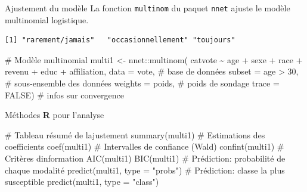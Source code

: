 \documentclass[
  ignorenonframetext,
]{beamer}
\newenvironment{Shaded}{\begin{snugshade}}{\end{snugshade}}
\newcommand{\AttributeTok}[1]{\textcolor[rgb]{0.40,0.45,0.13}{#1}}
\newcommand{\CommentTok}[1]{\textcolor[rgb]{0.37,0.37,0.37}{#1}}
\newcommand{\ConstantTok}[1]{\textcolor[rgb]{0.56,0.35,0.01}{#1}}
\newcommand{\DecValTok}[1]{\textcolor[rgb]{0.68,0.00,0.00}{#1}}
\newcommand{\FunctionTok}[1]{\textcolor[rgb]{0.28,0.35,0.67}{#1}}
\newcommand{\NormalTok}[1]{\textcolor[rgb]{0.00,0.23,0.31}{#1}}
\newcommand{\OtherTok}[1]{\textcolor[rgb]{0.00,0.23,0.31}{#1}}
\newcommand{\SpecialCharTok}[1]{\textcolor[rgb]{0.37,0.37,0.37}{#1}}
\newcommand{\StringTok}[1]{\textcolor[rgb]{0.13,0.47,0.30}{#1}}
\begin{document}
\begin{frame}[fragile]{Ajustement du modèle}
\protect\hypertarget{ajustement-du-moduxe8le}{}
La fonction \texttt{multinom} du paquet \texttt{nnet} ajuste le modèle
multinomial logistique.

\begin{Shaded}
\end{Shaded}

\begin{verbatim}
[1] "rarement/jamais"   "occasionnellement" "toujours"         
\end{verbatim}

\begin{Shaded}
\begin{Highlighting}[numbers=left,,]
\CommentTok{\# Modèle multinomial}
\NormalTok{multi1 }\OtherTok{\textless{}{-}}\NormalTok{ nnet}\SpecialCharTok{::}\FunctionTok{multinom}\NormalTok{(}
\NormalTok{  catvote }\SpecialCharTok{\textasciitilde{}}\NormalTok{ age }\SpecialCharTok{+}\NormalTok{ sexe }\SpecialCharTok{+}\NormalTok{ race }\SpecialCharTok{+}\NormalTok{ revenu }\SpecialCharTok{+}\NormalTok{ educ }\SpecialCharTok{+}\NormalTok{ affiliation, }
  \AttributeTok{data =}\NormalTok{ vote,       }\CommentTok{\# base de données}
  \AttributeTok{subset =}\NormalTok{ age }\SpecialCharTok{\textgreater{}} \DecValTok{30}\NormalTok{, }\CommentTok{\# sous{-}ensemble des données}
  \AttributeTok{weights =}\NormalTok{ poids,   }\CommentTok{\# poids de sondage}
  \AttributeTok{trace =} \ConstantTok{FALSE}\NormalTok{)     }\CommentTok{\# infos sur convergence}
\end{Highlighting}
\end{Shaded}
\end{frame}

\begin{frame}[fragile]{Méthodes \textbf{R} pour l'analyse}
\protect\hypertarget{muxe9thodes-r-pour-lanalyse}{}
\begin{Shaded}
\begin{Highlighting}[numbers=left,,]
\CommentTok{\# Tableau résumé de l\textquotesingle{}ajustement}
\FunctionTok{summary}\NormalTok{(multi1)}
\CommentTok{\# Estimations des coefficients}
\FunctionTok{coef}\NormalTok{(multi1)}
\CommentTok{\# Intervalles de confiance (Wald)}
\FunctionTok{confint}\NormalTok{(multi1)}
\CommentTok{\# Critères d\textquotesingle{}information}
\FunctionTok{AIC}\NormalTok{(multi1)}
\FunctionTok{BIC}\NormalTok{(multi1)}
\CommentTok{\# Prédiction: probabilité de chaque modalité}
\FunctionTok{predict}\NormalTok{(multi1, }\AttributeTok{type =} \StringTok{"probs"}\NormalTok{)}
\CommentTok{\# Prédiction: classe la plus susceptible}
\FunctionTok{predict}\NormalTok{(multi1, }\AttributeTok{type =} \StringTok{"class"}\NormalTok{)}
\end{Highlighting}
\end{Shaded}
\end{frame}
\end{document}
